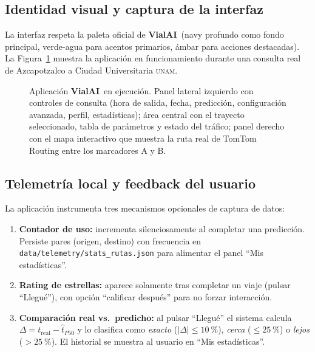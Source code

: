 \documentclass[11pt,a4paper]{article}
\newcommand{\VialAI}{\textbf{\textcolor{vialTeal}{Vial}\textcolor{vialAmber}{AI}}}
\begin{document}
\subsection{Identidad visual y captura de la interfaz}

La interfaz respeta la paleta oficial de \VialAI\ (navy profundo
como fondo principal, verde-agua para acentos primarios, ámbar
para acciones destacadas). La Figura~\ref{fig:ui} muestra la
aplicación en funcionamiento durante una consulta real de
Azcapotzalco a Ciudad Universitaria \textsc{unam}.

\begin{figure}[H]
\centering
{}
\caption{Aplicaci\'on \VialAI\ en ejecuci\'on. Panel lateral
izquierdo con controles de consulta (hora de salida, fecha,
predicci\'on, configuraci\'on avanzada, perfil, estad\'isticas);
\'area central con el trayecto seleccionado, tabla de par\'ametros y
estado del tr\'afico; panel derecho con el mapa interactivo que
muestra la ruta real de TomTom Routing entre los marcadores A y
B.}
\label{fig:ui}
\end{figure}

\subsection{Telemetría local y feedback del usuario}

La aplicación instrumenta tres mecanismos opcionales de captura
de datos:

\begin{enumerate}
\item \textbf{Contador de uso:} incrementa silenciosamente al
completar una predicción. Persiste pares (origen, destino) con
frecuencia en \texttt{data/telemetry/stats\_rutas.json} para
alimentar el panel ``Mis estadísticas''.
\item \textbf{Rating de estrellas:} aparece solamente tras
completar un viaje (pulsar ``Llegué''), con opción ``calificar
después'' para no forzar interacción.
\item \textbf{Comparación real vs.\ predicho:} al pulsar
``Llegué'' el sistema calcula $\Delta = t_\text{real} -
\hat{t}_{P50}$ y lo clasifica como \emph{exacto} ($|\Delta|
\leq \SI{10}{\percent}$), \emph{cerca} ($\leq \SI{25}{\percent}$)
o \emph{lejos} ($> \SI{25}{\percent}$). El historial se muestra
al usuario en ``Mis estadísticas''.
\end{enumerate}
\end{document}
